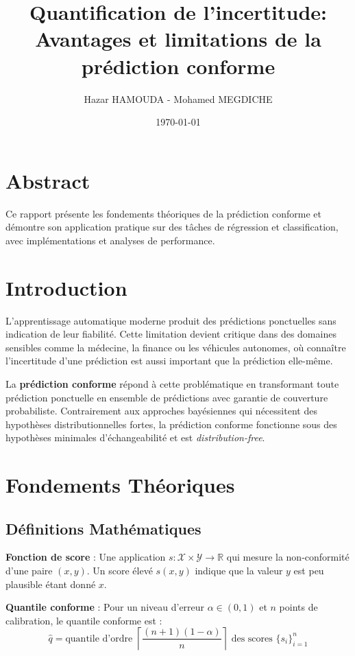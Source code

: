 \documentclass[a4paper,12pt]{article}
\title{\textbf{Quantification de l'incertitude:\\ Avantages et limitations de la prédiction conforme}}
\author{Hazar HAMOUDA - Mohamed MEGDICHE}
\date{\today}
\begin{document}
\linenumbers
\maketitle

\section{Abstract}
Ce rapport présente les fondements théoriques de la prédiction conforme et démontre son application pratique sur des tâches de régression et classification, avec implémentations et analyses de performance.

\section{Introduction}

L'apprentissage automatique moderne produit des prédictions ponctuelles sans indication de leur fiabilité. Cette limitation devient critique dans des domaines sensibles comme la médecine, la finance ou les véhicules autonomes, où connaître l'incertitude d'une prédiction est aussi important que la prédiction elle-même.

La \textbf{prédiction conforme} répond à cette problématique en transformant toute prédiction ponctuelle en ensemble de prédictions avec garantie de couverture probabiliste. Contrairement aux approches bayésiennes qui nécessitent des hypothèses distributionnelles fortes, la prédiction conforme fonctionne sous des hypothèses minimales d'échangeabilité et est \textit{distribution-free}.


\section{Fondements Théoriques}

\subsection{Définitions Mathématiques}

\textbf{Fonction de score} : Une application $s : \mathcal{X} \times \mathcal{Y} \rightarrow \mathbb{R}$ qui mesure la non-conformité d'une paire $(x, y)$. Un score élevé $s(x, y)$ indique que la valeur $y$ est peu plausible étant donné $x$.

\textbf{Quantile conforme} : Pour un niveau d'erreur $\alpha \in (0,1)$ et $n$ points de calibration, le quantile conforme est :
$$\hat{q} = \text{quantile d'ordre } \left\lceil \frac{(n+1)(1 - \alpha)}{n} \right\rceil \text{ des scores } \{s_i\}_{i=1}^n$$
\end{document}
